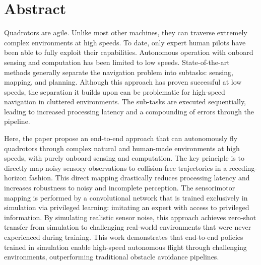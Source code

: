 \chapter*{Abstract}
Quadrotors are agile. Unlike most other machines, they can traverse extremely complex environments at high
speeds. To date, only expert human pilots have been able to fully exploit their capabilities. Autonomous operation with onboard sensing and computation has been limited to low speeds. State-of-the-art methods generally
separate the navigation problem into subtasks: sensing, mapping, and planning. Although this approach has
proven successful at low speeds, the separation it builds upon can be problematic for high-speed navigation in
cluttered environments. The sub-tasks are executed sequentially, leading to increased processing latency and a
compounding of errors through the pipeline.

Here, the paper propose an end-to-end approach that can autonomously
fly quadrotors through complex natural and human-made environments at high speeds, with purely onboard
sensing and computation. The key principle is to directly map noisy sensory observations to collision-free trajectories in a receding-horizon fashion. This direct mapping drastically reduces processing latency and increases
robustness to noisy and incomplete perception. The sensorimotor mapping is performed by a convolutional network that is trained exclusively in simulation via privileged learning: imitating an expert with access to privileged
information. By simulating realistic sensor noise, this approach achieves zero-shot transfer from simulation to
challenging real-world environments that were never experienced during training. This work demonstrates that end-to-end policies trained in
simulation enable high-speed autonomous flight through challenging environments, outperforming traditional
obstacle avoidance pipelines.
